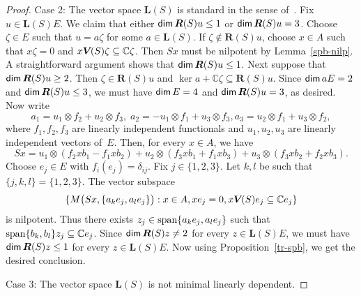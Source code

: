 \documentclass[a4paper,12pt,reqno]{amsart}
\numberwithin{equation}{section}
\theoremstyle{definition}
\begin{document}
\begin{proof}
\smallskip\noindent
Case 2:
The vector space ${{\bm L(S)}}$ is standard in the sense of~\cite{ChSe}.
Fix $u \in {{\bm L(S)}} E$.  We claim that  either ${{\sf dim}\,} {{\bm R(S)}} u\leq 1$ or ${{\sf dim}\,} {{\bm R(S)}} u=3$.
Choose $\zeta \in E$ such that $u= a \zeta$ for some $a\in{{\bm L(S)}}$.  If $\zeta \not\in{{\bm R(S)}} u$, choose $x \in A$
such that $x \zeta=0$ and $x {{\bm V\mkern-2.5mu(S)}}\zeta \subseteq {\mathbb{C}} \zeta$. Then $Sx$ must be nilpotent by Lemma~\ref{spb-nilp}.
A straightforward argument shows  that ${{\sf dim}\,}{{\bm R(S)}} u\leq1$.
Next suppose that ${{\sf dim}\,} {{\bm R(S)}} u \geq 2$. Then $\zeta \in {{\bm R(S)}} u$ and $\ker a + {\mathbb{C}} \zeta \subseteq {{\bm R(S)}} u$.
Since ${{\sf dim}\,} aE=2$ and ${{\sf dim}\,} {{\bm R(S)}} u \leq 3$, we must have ${{\sf dim}\,} E=4$ and ${{\sf dim}\,}{{\bm R(S)}} u=3$, as desired.  Now write
\begin{equation*}
a_1= u_1 \otimes f_2 + u_2 \otimes f_3, \; a_2= - u_1 \otimes f_1+ u_3 \otimes f_3, a_3= u_2 \otimes f_1 + u_3 \otimes f_2,
\end{equation*}
where  $f_1, f_2, f_3$ are linearly independent functionals and  $ u_1,u_2, u_3$ are linearly independent vectors of~$E$.
Then, for every $x \in A$, we have
\begin{equation*}
Sx= u_1 \otimes (f_2 xb_1-f_1 x b_2) + u_2 \otimes (f_3 x b_1+ f_1 x b_3)+ u_3 \otimes (f_3 x b_2+ f_2 x b_3).
\end{equation*}
Choose $e_j \in E$ with $f_i (e_j)= \delta_{ij}$.
Fix $j \in \{1,2,3\}$. Let $k,l$ be such that $\{j,k,l\}= \{1,2,3\}$. The vector subspace
\begin{equation*}
\{M\bigl(Sx, \{a_ke_j, a_l e_j\}\bigr): x \in A, xe_j=0, x {{\bm V\mkern-2.5mu(S)}} e_j \subseteq {\mathbb{C}} e_j\}
\end{equation*}
is nilpotent. Thus there exists $z_j \in {{\rm span}}\{a_ke_j,a_l e_j\}$ such that $ {{\rm span}} \{b_k, b_l\} z_j \subseteq {\mathbb{C}} e_j$.
Since ${{\sf dim}\,} {{\bm R(S)}} z \neq 2$ for every $z \in {{\bm L(S)}} E$, we must  have ${{\sf dim}\,} {{\bm R(S)}} z \leq 1$ for every $z \in {{\bm L(S)}} E$.
Now using Proposition~\ref{tr-spb}, we get the desired conclusion.

\smallskip\noindent
Case 3: The vector space ${{\bm L(S)}}$ is not minimal linearly dependent.


\end{proof}
\end{document}
